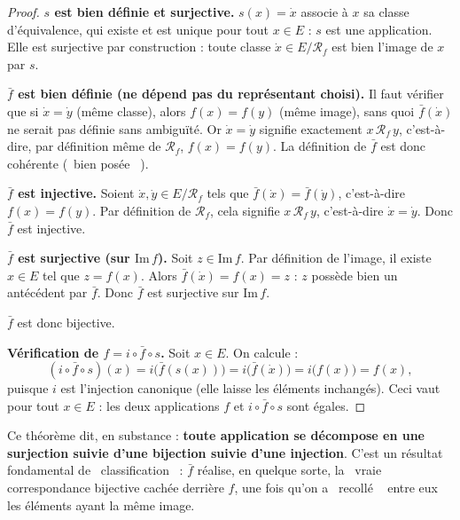 \documentclass[a4paper,12pt,openany]{book}
\providecommand{\og}{\guillemotleft~}
\providecommand{\fg}{\ifhmode~\fi\guillemotright}
\begin{document}
\begin{proof}
\textbf{$s$ est bien définie et surjective.} $s(x)=\dot x$ associe à $x$ sa
classe d'équivalence, qui existe et est unique pour tout $x\in E$ : $s$ est
une application. Elle est surjective par construction : toute classe
$\dot x \in E/\mathcal{R}_f$ est bien l'image de $x$ par $s$.

\textbf{$\bar f$ est bien définie (ne dépend pas du représentant choisi).}
Il faut vérifier que si $\dot x = \dot y$ (même classe), alors $f(x)=f(y)$
(même image), sans quoi $\bar f(\dot x)$ ne serait pas définie sans
ambiguïté. Or $\dot x = \dot y$ signifie exactement $x\,\mathcal{R}_f\,y$,
c'est-à-dire, par définition même de $\mathcal{R}_f$, $f(x)=f(y)$. La
définition de $\bar f$ est donc cohérente (\og bien posée \fg).

\textbf{$\bar f$ est injective.} Soient $\dot x, \dot y \in E/\mathcal{R}_f$
tels que $\bar f(\dot x) = \bar f(\dot y)$, c'est-à-dire $f(x)=f(y)$. Par
définition de $\mathcal{R}_f$, cela signifie $x\,\mathcal{R}_f\,y$,
c'est-à-dire $\dot x = \dot y$. Donc $\bar f$ est injective.

\textbf{$\bar f$ est surjective (sur $\mathrm{Im}\,f$).} Soit $z \in
\mathrm{Im}\,f$. Par définition de l'image, il existe $x\in E$ tel que
$z=f(x)$. Alors $\bar f(\dot x) = f(x) = z$ : $z$ possède bien un
antécédent par $\bar f$. Donc $\bar f$ est surjective sur $\mathrm{Im}\,f$.

$\bar f$ est donc bijective.

\textbf{Vérification de $f = i\circ \bar f \circ s$.} Soit $x\in E$. On
calcule :
\[
(i\circ \bar f \circ s)(x) = i\big(\bar f(s(x))\big) = i\big(\bar f(\dot
x)\big) = i\big(f(x)\big) = f(x),
\]
puisque $i$ est l'injection canonique (elle laisse les éléments inchangés).
Ceci vaut pour tout $x \in E$ : les deux applications $f$ et $i\circ \bar f
\circ s$ sont égales.
\end{proof}

\begin{remarque}[Interprétation]
Ce théorème dit, en substance : \textbf{toute application se décompose en
une surjection suivie d'une bijection suivie d'une injection}. C'est un
résultat fondamental de \og classification \fg : $\bar f$ réalise, en
quelque sorte, la \og vraie \fg{} correspondance bijective cachée derrière
$f$, une fois qu'on a \og recollé \fg{} entre eux les éléments ayant la même
image.
\end{remarque}
\end{document}
